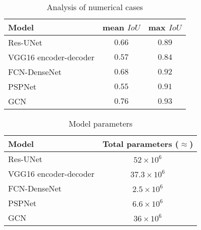 \begin{table}[ht!]
	\centering
	\caption{Analysis of numerical cases}
	\label{tab:table_all_numerical_cases}
	{
		\begin{tabular}{lcc}
			\toprule
			Model & mean \(IoU\) & max \(IoU\) \\ 
			\midrule 
			Res-UNet & \(0.66\) & \(0.89\) \\ 
			VGG16 encoder-decoder & \(0.57\) & \(0.84\) \\ 
			FCN-DenseNet & \(0.68\) & \(0.92\) \\ 
			PSPNet & \(0.55\) & \(0.91\) \\ 
			GCN & \(0.76\) & \(0.93\) \\ 
			\bottomrule
		\end{tabular}
	}
\end{table}
\begin{table}[ht!]
	\centering
	\caption{Model parameters}
	\label{tab:table_parameters}
	{
		\begin{tabular}{lc}
			\toprule
			Model & Total parameters ($\approx$) \\ 
			\midrule 
			Res-UNet & \(52\times 10^{6}\) \\ 
			VGG16 encoder-decoder & \(37.3\times 10^{6}\) \\ 
			FCN-DenseNet & \(2.5\times 10^{6}\) \\ 
			PSPNet & \(6.6\times 10^{6}\) \\ 
			GCN & \(36\times 10^{6}\) \\ 
			\bottomrule
		\end{tabular}
	}
\end{table}
\clearpage
